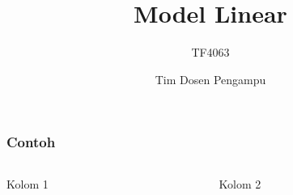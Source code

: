 \documentclass[english,10pt,fleqn]{beamer}
\begin{document}
\title{Model Linear}
\subtitle{TF4063}
\author{Tim Dosen Pengampu}
\date{}


\frame{\titlepage}


\begin{frame} %
\frametitle{Contoh}

\begin{columns}

  \begin{column}{0.5\textwidth}
  Kolom 1
  \end{column}

  \begin{column}{0.5\textwidth}
  Kolom 2
  \end{column}

\end{columns}

\end{frame} %
\end{document}
